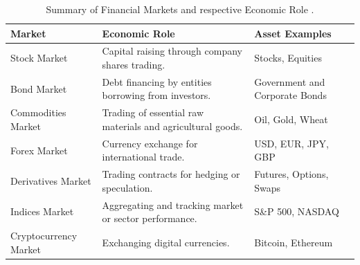 \begin{table}[htb!]
\centering
\footnotesize
\begin{tabularx}{\textwidth}{@{}lXl@{}}
\toprule
\textbf{Market} & \textbf{Economic Role} & \textbf{Asset Examples} \\
\midrule
Stock Market & Capital raising through company shares trading. & Stocks, Equities \\
\addlinespace
Bond Market & Debt financing by entities borrowing from investors. & Government and Corporate Bonds \\
\addlinespace
Commodities Market & Trading of essential raw materials and agricultural goods. & Oil, Gold, Wheat \\
\addlinespace
Forex Market & Currency exchange for international trade. & USD, EUR, JPY, GBP \\
\addlinespace
Derivatives Market & Trading contracts for hedging or speculation. & Futures, Options, Swaps \\
\addlinespace
Indices Market & Aggregating and tracking market or sector performance. & S\&P 500, NASDAQ \\
\addlinespace
Cryptocurrency Market & Exchanging digital currencies. & Bitcoin, Ethereum \\
\bottomrule
\end{tabularx}
\caption{Summary of Financial Markets and respective Economic Role \cite{brandimarte_introduction_2018}.}
\label{Tables:FinancialMarkets}
\end{table}